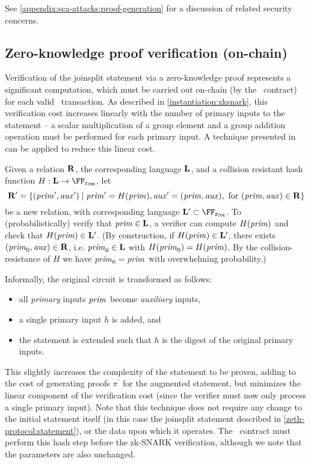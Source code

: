 See \cref{appendix:sca-attacks:proof-generation} for a discussion of related security concerns.

\subsection{Zero-knowledge proof verification (on-chain)}

Verification of the joinsplit statement via a zero-knowledge proof represents a significant computation, which must be carried out on-chain (by the \mixer~contract) for each valid \zeth~transaction. As described in \cref{instantiation:zksnark}, this verification cost increases linearly with the number of primary inputs to the statement -- a scalar multiplication of a group element and a group addition operation must be performed for each primary input. A technique presented in \cite[Section 4.5.1]{GGPR13} can be applied to reduce this linear cost.

Given a relation $\mathbf{R}$, the corresponding language $\mathbf{L}$, and a collision resistant hash function $H : \LANG \to \FFx{\rCURVE}$, let
\[
  \mathbf{R}^\prime =
  \left\{ (\mathit{prim}^\prime, \mathit{aux}^\prime) \mid \mathit{prim}' = H(\mathit{prim}),
    \mathit{aux}' = (\mathit{prim}, \mathit{aux}), \allowbreak \text{ for } \allowbreak (\mathit{prim},
    \mathit{aux}) \in \mathbf{R}
  \right\}
\]
be a new relation, with corresponding language $\LANG^\prime \subset \FFx{\rCURVE}$. To (probabilistically) verify that $\mathit{prim} \in \mathbf{L}$, a verifier can compute $H(\mathit{prim})$ and check that $H(\mathit{prim}) \in \mathbf{L}^\prime$.  (By construction, if $H(\mathit{prim}) \in \mathbf{L}^\prime$, there exists $(\mathit{prim}_0, \mathit{aux}) \in \mathbf{R}$, i.e. $\mathit{prim}_0 \in \mathbf{L}$ with $H(\mathit{prim}_0) = H(\mathit{prim})$. By the collision-resistance of $H$ we have $\mathit{prim}_0 = \mathit{prim}$ with overwhelming probability.)

Informally, the original circuit is transformed as follows:
\begin{itemize}
  \item all \emph{primary} inputs $\mathit{prim}$ become \emph{auxiliary} inputs,
  \item a single primary input $h$ is added, and
  \item the statement is extended such that $h$ is the digest of the original primary inputs.
\end{itemize}

This slightly increases the complexity of the statement to be proven, adding to the cost of generating proofs $\pi^\prime$ for the augmented statement, but minimizes the linear component of the verification cost (since the verifier must now only process a single primary input). Note that this technique does not require any change to the initial statement itself (in this case the joinsplit statement described in \cref{zeth-protocol:statement}), or the data upon which it operates. The \mixer~contract must perform this hash step before the zk-SNARK verification, although we note that the parameters are also unchanged.

